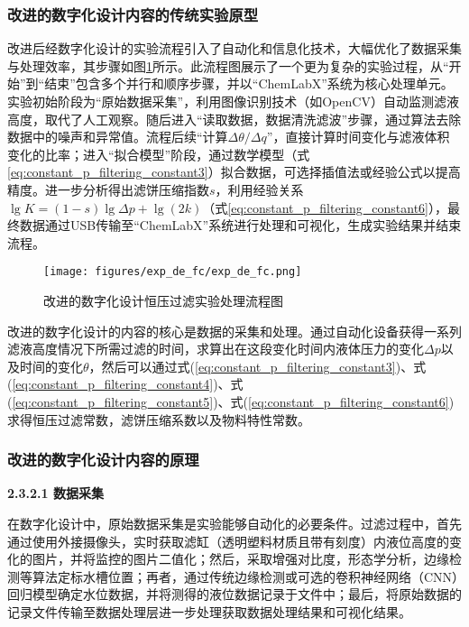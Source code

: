 \subsubsection{改进的数字化设计内容的传统实验原型}

改进后经数字化设计的实验流程引入了自动化和信息化技术，大幅优化了数据采集与处理效率，其步骤如图\ref{fig:exp_de_fc}所示。此流程图展示了一个更为复杂的实验过程，从“开始”到“结束”包含多个并行和顺序步骤，并以“ChemLabX”系统为核心处理单元。实验初始阶段为“原始数据采集”，利用图像识别技术（如OpenCV）自动监测滤液高度，取代了人工观察。随后进入“读取数据，数据清洗滤波”步骤，通过算法去除数据中的噪声和异常值。流程后续“计算\(\Delta \theta / \Delta q\)”，直接计算时间变化与滤液体积变化的比率；进入“拟合模型”阶段，通过数学模型（式\ref{eq:constant_p_filtering_constant3}）拟合数据，可选择插值法或经验公式以提高精度。进一步分析得出滤饼压缩指数\(s\)，利用经验关系\(\lg K = (1 - s) \lg \Delta p + \lg (2k)\)（式\ref{eq:constant_p_filtering_constant6}），最终数据通过USB传输至“ChemLabX”系统进行处理和可视化，生成实验结果并结束流程。

\begin{figure}[H]
    \centering
    \texttt{[image: figures/exp\_de\_fc/exp\_de\_fc.png]}
    \caption{改进的数字化设计恒压过滤实验处理流程图}
    \label{fig:exp_de_fc}
\end{figure}

改进的数字化设计的内容的核心是数据的采集和处理。通过自动化设备获得一系列滤液高度情况下所需过滤的时间，求算出在这段变化时间内液体压力的变化\(\Delta p\)以及时间的变化\(\theta\)，然后可以通过式(\ref{eq:constant_p_filtering_constant3})、式(\ref{eq:constant_p_filtering_constant4})、式(\ref{eq:constant_p_filtering_constant5})、式(\ref{eq:constant_p_filtering_constant6})求得恒压过滤常数，滤饼压缩系数以及物料特性常数。

\subsubsection{改进的数字化设计内容的原理}

{\noindent \wuhao \rmfamily {} \textbf{2.3.2.1 \quad 数据采集}}




在数字化设计中，原始数据采集是实验能够自动化的必要条件。过滤过程中，首先通过使用外接摄像头，实时获取滤缸（透明塑料材质且带有刻度）内液位高度的变化的图片，并将监控的图片二值化；然后，采取增强对比度，形态学分析，边缘检测等算法定标水槽位置；再者，通过传统边缘检测或可选的卷积神经网络（CNN）回归模型确定水位数据，并将测得的液位数据记录于文件中；最后，将原始数据的记录文件传输至数据处理层进一步处理获取数据处理结果和可视化结果。

